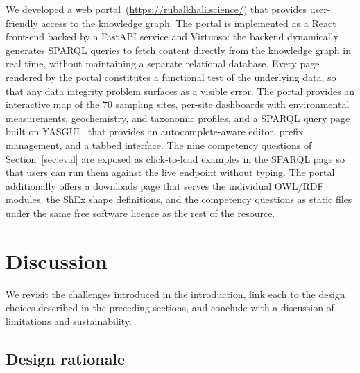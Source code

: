 \documentclass[11pt,a4paper]{article}
\begin{document}
We developed a web portal~(\url{https://rubalkhali.science/}) that
provides user-friendly access to the knowledge graph. The portal is
implemented as a React front-end backed by a FastAPI service and
Virtuoso: the backend dynamically generates SPARQL queries to fetch
content directly from the knowledge graph in real time, without
maintaining a separate relational database. Every page rendered by
the portal constitutes a functional test of the underlying data, so
that any data integrity problem surfaces as a visible error. The
portal provides an interactive map of the 70 sampling sites,
per-site dashboards with environmental measurements, geochemistry,
and taxonomic profiles, and a SPARQL query page built on
YASGUI~\cite{yasgui} that provides an autocomplete-aware editor,
prefix management, and a tabbed interface. The nine competency
questions of Section~\ref{sec:eval} are exposed as click-to-load
examples in the SPARQL page so that users can run them against the
live endpoint without typing. The portal additionally offers a
downloads page that serves the individual OWL/RDF modules, the ShEx
shape definitions, and the competency questions as static files
under the same free software licence as the rest of the resource.

\section{Discussion}\label{sec:discussion}

We revisit the challenges introduced in the introduction, link each
to the design choices described in the preceding sections, and
conclude with a discussion of limitations and sustainability.

\subsection{Design rationale}
\end{document}
